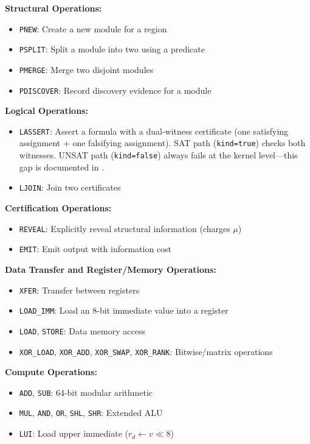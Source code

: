 \textbf{Structural Operations:}
\begin{itemize}
    \item \texttt{PNEW}: Create a new module for a region
    \item \texttt{PSPLIT}: Split a module into two using a predicate
    \item \texttt{PMERGE}: Merge two disjoint modules
    \item \texttt{PDISCOVER}: Record discovery evidence for a module
\end{itemize}

\textbf{Logical Operations:}
\begin{itemize}
    \item \texttt{LASSERT}: Assert a formula with a dual-witness certificate (one satisfying assignment + one falsifying assignment). SAT path (\texttt{kind=true}) checks both witnesses. UNSAT path (\texttt{kind=false}) always fails at the kernel level---this gap is documented in .
    \item \texttt{LJOIN}: Join two certificates
\end{itemize}

\textbf{Certification Operations:}
\begin{itemize}
    \item \texttt{REVEAL}: Explicitly reveal structural information (charges $\mu$)
    \item \texttt{EMIT}: Emit output with information cost
\end{itemize}

\textbf{Data Transfer and Register/Memory Operations:}
\begin{itemize}
    \item \texttt{XFER}: Transfer between registers
    \item \texttt{LOAD\_IMM}: Load an 8-bit immediate value into a register
    \item \texttt{LOAD}, \texttt{STORE}: Data memory access
    \item \texttt{XOR\_LOAD}, \texttt{XOR\_ADD}, \texttt{XOR\_SWAP}, \texttt{XOR\_RANK}: Bitwise/matrix operations
\end{itemize}

\textbf{Compute Operations:}
\begin{itemize}
    \item \texttt{ADD}, \texttt{SUB}: 64-bit modular arithmetic
    \item \texttt{MUL}, \texttt{AND}, \texttt{OR}, \texttt{SHL}, \texttt{SHR}: Extended ALU
    \item \texttt{LUI}: Load upper immediate ($r_d \leftarrow v \ll 8$)
\end{itemize}

